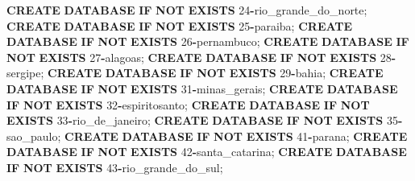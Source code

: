 \documentclass[
]{book}
\newenvironment{Shaded}{\begin{snugshade}}{\end{snugshade}}
\newcommand{\ControlFlowTok}[1]{\textcolor[rgb]{0.13,0.29,0.53}{\textbf{#1}}}
\newcommand{\DecValTok}[1]{\textcolor[rgb]{0.00,0.00,0.81}{#1}}
\newcommand{\KeywordTok}[1]{\textcolor[rgb]{0.13,0.29,0.53}{\textbf{#1}}}
\newcommand{\NormalTok}[1]{#1}
\newcommand{\OperatorTok}[1]{\textcolor[rgb]{0.81,0.36,0.00}{\textbf{#1}}}
\begin{document}
\begin{Shaded}
\begin{Highlighting}[]
\KeywordTok{CREATE} \KeywordTok{DATABASE} \ControlFlowTok{IF} \KeywordTok{NOT} \KeywordTok{EXISTS}\NormalTok{ \textasciigrave{}}\DecValTok{24}\OperatorTok{{-}}\NormalTok{rio\_grande\_do\_norte\textasciigrave{};}
\KeywordTok{CREATE} \KeywordTok{DATABASE} \ControlFlowTok{IF} \KeywordTok{NOT} \KeywordTok{EXISTS}\NormalTok{ \textasciigrave{}}\DecValTok{25}\OperatorTok{{-}}\NormalTok{paraiba\textasciigrave{};}
\KeywordTok{CREATE} \KeywordTok{DATABASE} \ControlFlowTok{IF} \KeywordTok{NOT} \KeywordTok{EXISTS}\NormalTok{ \textasciigrave{}}\DecValTok{26}\OperatorTok{{-}}\NormalTok{pernambuco\textasciigrave{};}
\KeywordTok{CREATE} \KeywordTok{DATABASE} \ControlFlowTok{IF} \KeywordTok{NOT} \KeywordTok{EXISTS}\NormalTok{ \textasciigrave{}}\DecValTok{27}\OperatorTok{{-}}\NormalTok{alagoas\textasciigrave{};}
\KeywordTok{CREATE} \KeywordTok{DATABASE} \ControlFlowTok{IF} \KeywordTok{NOT} \KeywordTok{EXISTS}\NormalTok{ \textasciigrave{}}\DecValTok{28}\OperatorTok{{-}}\NormalTok{sergipe\textasciigrave{};}
\KeywordTok{CREATE} \KeywordTok{DATABASE} \ControlFlowTok{IF} \KeywordTok{NOT} \KeywordTok{EXISTS}\NormalTok{ \textasciigrave{}}\DecValTok{29}\OperatorTok{{-}}\NormalTok{bahia\textasciigrave{};}
\KeywordTok{CREATE} \KeywordTok{DATABASE} \ControlFlowTok{IF} \KeywordTok{NOT} \KeywordTok{EXISTS}\NormalTok{ \textasciigrave{}}\DecValTok{31}\OperatorTok{{-}}\NormalTok{minas\_gerais\textasciigrave{};}
\KeywordTok{CREATE} \KeywordTok{DATABASE} \ControlFlowTok{IF} \KeywordTok{NOT} \KeywordTok{EXISTS}\NormalTok{ \textasciigrave{}}\DecValTok{32}\OperatorTok{{-}}\NormalTok{espiritosanto\textasciigrave{};}
\KeywordTok{CREATE} \KeywordTok{DATABASE} \ControlFlowTok{IF} \KeywordTok{NOT} \KeywordTok{EXISTS}\NormalTok{ \textasciigrave{}}\DecValTok{33}\OperatorTok{{-}}\NormalTok{rio\_de\_janeiro\textasciigrave{};}
\KeywordTok{CREATE} \KeywordTok{DATABASE} \ControlFlowTok{IF} \KeywordTok{NOT} \KeywordTok{EXISTS}\NormalTok{ \textasciigrave{}}\DecValTok{35}\OperatorTok{{-}}\NormalTok{sao\_paulo\textasciigrave{};}
\KeywordTok{CREATE} \KeywordTok{DATABASE} \ControlFlowTok{IF} \KeywordTok{NOT} \KeywordTok{EXISTS}\NormalTok{ \textasciigrave{}}\DecValTok{41}\OperatorTok{{-}}\NormalTok{parana\textasciigrave{};}
\KeywordTok{CREATE} \KeywordTok{DATABASE} \ControlFlowTok{IF} \KeywordTok{NOT} \KeywordTok{EXISTS}\NormalTok{ \textasciigrave{}}\DecValTok{42}\OperatorTok{{-}}\NormalTok{santa\_catarina\textasciigrave{};}
\KeywordTok{CREATE} \KeywordTok{DATABASE} \ControlFlowTok{IF} \KeywordTok{NOT} \KeywordTok{EXISTS}\NormalTok{ \textasciigrave{}}\DecValTok{43}\OperatorTok{{-}}\NormalTok{rio\_grande\_do\_sul\textasciigrave{};}

\end{Highlighting}
\end{Shaded}
\end{document}
